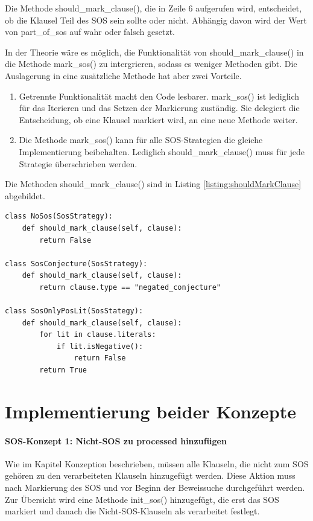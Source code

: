 Die Methode should\_mark\_clause(), die in Zeile 6 aufgerufen wird, entscheidet, ob die Klausel Teil des SOS sein sollte oder nicht. Abhängig davon wird der Wert von part\_of\_sos auf wahr oder falsch gesetzt.

In der Theorie wäre es möglich, die Funktionalität von should\_mark\_clause() in die Methode mark\_sos() zu intergrieren, sodass es weniger Methoden gibt. Die Auslagerung in eine zusätzliche Methode hat aber zwei Vorteile.
\begin{enumerate}
	\item Getrennte Funktionalität macht den Code lesbarer. mark\_sos() ist lediglich für das Iterieren und das Setzen der Markierung zuständig. Sie delegiert die Entscheidung, ob eine Klausel markiert wird, an eine neue Methode weiter.
	\item Die Methode mark\_sos() kann für alle SOS-Strategien die gleiche Implementierung beibehalten. Lediglich should\_mark\_clause() muss für jede Strategie überschrieben werden.
\end{enumerate}

Die Methoden should\_mark\_clause() sind in Listing \ref{listing:shouldMarkClause} abgebildet.
\begin{lstlisting}[caption={Markierungsmethoden für drei der vier SOS-Strategien. Die Klasse SosOnlyNegLit wurde weggelassen, da sie die gleiche Codestuktur wie SosOnlyPosLit besitzt.}, label={listing:shouldMarkClause}]
class NoSos(SosStrategy):
	def should_mark_clause(self, clause):
		return False

class SosConjecture(SosStrategy):
	def should_mark_clause(self, clause):
		return clause.type == "negated_conjecture"
		
class SosOnlyPosLit(SosStategy):
    def should_mark_clause(self, clause):
		for lit in clause.literals:
			if lit.isNegative():
				return False
		return True
\end{lstlisting}


\section{Implementierung beider Konzepte}
\label{section:4.3}

\paragraph{SOS-Konzept 1: Nicht-SOS zu processed hinzufügen}

Wie im Kapitel Konzeption beschrieben, müssen alle Klauseln, die nicht zum SOS gehören zu den verarbeiteten Klauseln hinzugefügt werden. Diese Aktion muss nach Markierung des SOS und vor Beginn der Beweissuche durchgeführt werden. Zur Übersicht wird eine Methode init\_sos() hinzugefügt, die erst das SOS markiert und danach die Nicht-SOS-Klauseln als verarbeitet festlegt.

